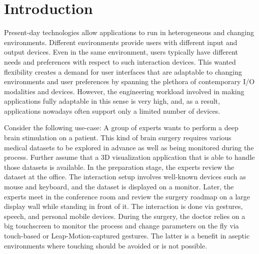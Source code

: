 \documentclass[twoside,twocolumn,10pt]{article}
\begin{document}

%
%
%
%
%
%
%

\section{Introduction}
\label{sec:introduction}
\copyrightspace





%
%
Present-day technologies allow applications to run in heterogeneous and changing environments. Different environments provide users with different input and output devices. Even in the same environment, users typically have different needs and preferences with respect to such interaction devices. This wanted flexibility creates a demand for user interfaces that are adaptable to changing environments and user preferences by spanning the plethora of contemporary I/O modalities and devices. However, the engineering workload involved in making applications fully adaptable in this sense is very high, and, as a result, applications nowadays often support only a limited number of devices.



%
%

Consider the following use-case: A group of experts wants to perform a deep brain stimulation on a patient. This kind of brain surgery requires various medical datasets to be explored in advance as well as being monitored during the process. Further assume that a 3D visualization application that is able to handle those datasets is available.
In the preparation stage, the experts review the dataset at the office. The interaction setup involves well-known devices such as mouse and keyboard, and the dataset is displayed on a monitor. Later, the experts meet in the conference room and review the surgery roadmap on a large display wall while standing in front of it. The interaction is done via gestures, speech, and personal mobile devices. During the surgery, the doctor relies on a big touchscreen to monitor the process and change parameters on the fly via touch-based or Leap-Motion-captured gestures. The latter is a benefit in aseptic environments where touching should be avoided or is not possible.
\end{document}
